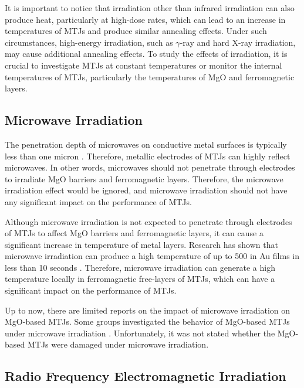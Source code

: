 \documentclass[molecules,review,submit,pdftex,moreauthors]{Definitions/mdpi}
\begin{document}
It is important to notice that irradiation other than infrared irradiation can also produce heat, particularly at high-dose rates, which can lead to an increase in  temperatures of MTJs and produce similar annealing effects.  Under such circumstances, high-energy irradiation, such as $\gamma$-ray and hard X-ray irradiation, may cause additional annealing effects.  To study the effects of irradiation, it is crucial to investigate MTJs at constant temperatures or monitor the internal temperatures of MTJs, particularly the temperatures of MgO and ferromagnetic layers.   


\subsection{Microwave Irradiation}


The penetration depth of microwaves on conductive metal surfaces is typically less than one micron \cite{YoshiKawa2010JMPEE}.  Therefore, metallic electrodes of MTJs can highly reflect microwaves.  In other words, microwaves should not penetrate through electrodes to irradiate MgO barriers and ferromagnetic layers.  Therefore, the microwave irradiation effect would be ignored, and microwave irradiation should not have any significant impact on the performance of MTJs.  


Although microwave irradiation is not expected to penetrate through electrodes of MTJs to affect MgO barriers and ferromagnetic layers, it can cause a significant increase in temperature of metal layers.  Research has shown that microwave irradiation can produce a high temperature of up to \unit{500}{\celsius} in Au films in less than 10 seconds \cite{Cao2009JMR}.  Therefore, microwave irradiation can generate a high temperature locally in ferromagnetic free-\fixed layers of MTJs, which can have a significant impact on the performance of MTJs.  


Up to now, there are limited reports on the impact of microwave irradiation on MgO-based MTJs.  Some groups investigated the behavior of MgO-based MTJs under microwave irradiation \cite{Gui2015APL}.  Unfortunately, it was not stated whether the MgO-based MTJs were damaged under microwave irradiation.


\subsection{Radio Frequency  Electromagnetic Irradiation}
\end{document}
